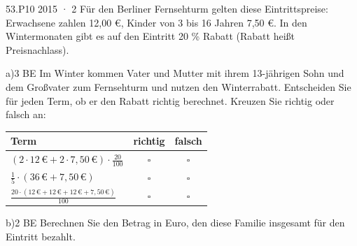 \documentclass[11pt]{article}
\begin{document}
\label{pruefstein}
\begin{pfaufgabe}{53.}{P10 2015 · 2}
Für den Berliner Fernsehturm gelten diese Eintrittspreise: Erwachsene zahlen 12,00 €, Kinder von 3 bis 16 Jahren 7,50 €. In den Wintermonaten gibt es auf den Eintritt 20 \% Rabatt (Rabatt heißt Preisnachlass).
\end{pfaufgabe}
\begin{pfaufgabe}{a)}{3 BE}
Im Winter kommen Vater und Mutter mit ihrem 13-jährigen Sohn und dem Großvater zum Fernsehturm und nutzen den Winterrabatt. Entscheiden Sie für jeden Term, ob er den Rabatt richtig berechnet. Kreuzen Sie richtig oder falsch an:
\par\smallskip\noindent \begingroup\renewcommand{\arraystretch}{1.5}\begin{tabular}{|l|c|c|}\hline Term & richtig & falsch\\ \hline $(2\cdot 12\,€ + 2\cdot 7{,}50\,€)\cdot\tfrac{20}{100}$ & $\square$ & $\square$ \\ $\tfrac{1}{5}\cdot(36\,€ + 7{,}50\,€)$ & $\square$ & $\square$ \\ $\tfrac{20\cdot(12\,€ + 12\,€ + 12\,€ + 7{,}50\,€)}{100}$ & $\square$ & $\square$ \\ \hline\end{tabular}\endgroup\par
{}
\end{pfaufgabe}
\begin{pfaufgabe}{b)}{2 BE}
Berechnen Sie den Betrag in Euro, den diese Familie insgesamt für den Eintritt bezahlt.
\end{pfaufgabe}
\end{document}
